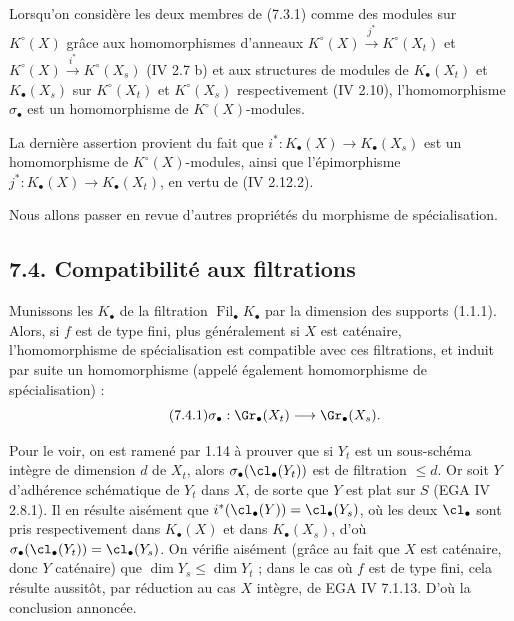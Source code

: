 Lorsqu'on considère les deux membres de (7.3.1) comme des modules sur \(K^\circ(X)\) grâce aux homomorphismes d'anneaux \(K^\circ(X)\xrightarrow{j^*}K^\circ(X_t)\) et \(K^\circ(X)\xrightarrow{i^*}K^\circ(X_s)\) (IV 2.7 b) et aux structures de modules de \(K_\bullet(X_t)\) et \(K_\bullet(X_s)\) sur \(K^\circ(X_t)\) et \(K^\circ(X_s)\) respectivement (IV 2.10), l'homomorphisme \(\sigma_\bullet\) est un homomorphisme de \(K^\circ(X)\)-modules.

La dernière assertion provient du fait que \(i^*:K_\bullet(X)\to K_\bullet(X_s)\) est un homomorphisme de \(K^\circ(X)\)-modules, ainsi que l'épimorphisme \(j^*:K_\bullet(X)\longrightarrow K_\bullet(X_t)\), en vertu de (IV 2.12.2).

Nous allons passer en revue d'autres propriétés du morphisme de spécialisation.

\subsection*{7.4. Compatibilité aux filtrations}
Munissons les \(K_\bullet\) de la filtration \(\operatorname{Fil}_\bullet K_\bullet\) par la dimension des supports (1.1.1). Alors, si \(f\) est de type fini, plus généralement si \(X\) est caténaire, l'homomorphisme de spécialisation est compatible avec ces filtrations, et induit par suite un homomorphisme (appelé également homomorphisme de spécialisation) :
\begin{equation}\tag{7.4.1}
  \sigma_\bullet:\Gr_\bullet(X_t)\longrightarrow \Gr_\bullet(X_s).
\end{equation}

Pour le voir, on est ramené par 1.14 à prouver que si \(Y_t\) est un sous-schéma intègre de dimension \(d\) de \(X_t\), alors \(\sigma_\bullet(\cl_\bullet(Y_t))\) est de filtration \(\leq d\). Or soit \(Y\) d'adhérence schématique de \(Y_t\) dans \(X\), de sorte que \(Y\) est plat sur \(S\) (EGA IV 2.8.1). Il en résulte aisément que \(i^*(\cl_\bullet(Y))=\cl_\bullet(Y_s)\), où les deux \(\cl_\bullet\) sont pris respectivement dans \(K_\bullet(X)\) et dans \(K_\bullet(X_s)\), d'où \(\sigma_\bullet(\cl_\bullet(Y_t))=\cl_\bullet(Y_s)\). On vérifie aisément (grâce au fait que \(X\) est caténaire, donc \(Y\) caténaire) que \(\dim Y_s\leq \dim Y_t\) ; dans le cas où \(f\) est de type fini, cela résulte aussitôt, par réduction au cas \(X\) intègre, de EGA IV 7.1.13. D'où la conclusion annoncée.

